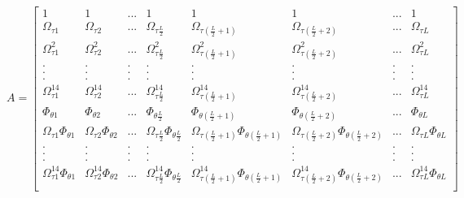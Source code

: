 $
A
=
\begin{bmatrix}
1 & 1 & ... & 1 & 1 & 1 & ... & 1 \\
\Omega_{\tau 1} & \Omega_{\tau 2} & ... & \Omega_{\tau \frac{L}{2}} & \Omega_{\tau (\frac{L}{2} + 1)} & \Omega_{\tau (\frac{L}{2} + 2)} & ... & \Omega_{\tau L} \\
\Omega^{2}_{\tau 1} & \Omega^{2}_{\tau 2} & ... & \Omega^{2}_{\tau \frac{L}{2}} & \Omega^{2}_{\tau (\frac{L}{2} + 1)} & \Omega^{2}_{\tau (\frac{L}{2} + 2)} & ... & \Omega^{2}_{\tau L} \\
. & . & . & . & . & . & . & . \\
. & . & . & . & . & . & . & . \\
. & . & . & . & . & . & . & . \\
\Omega^{14}_{\tau 1} & \Omega^{14}_{\tau 2} & ... & \Omega^{14}_{\tau \frac{L}{2}} & \Omega^{14}_{\tau (\frac{L}{2} + 1)} & \Omega^{14}_{\tau (\frac{L}{2} + 2)} & ... & \Omega^{14}_{\tau L} \\
\Phi_{\theta 1} & \Phi_{\theta 2} & ... & \Phi_{\theta \frac{L}{2}} & \Phi_{\theta (\frac{L}{2} + 1)} & \Phi_{\theta (\frac{L}{2} + 2)} & ... & \Phi_{\theta L} \\
\Omega_{\tau 1} \Phi_{\theta 1} & \Omega_{\tau 2} \Phi_{\theta 2} & ... & \Omega_{\tau \frac{L}{2}} \Phi_{\theta \frac{L}{2}} & \Omega_{\tau (\frac{L}{2} + 1)} \Phi_{\theta (\frac{L}{2} + 1)} & \Omega_{\tau (\frac{L}{2} + 2)} \Phi_{\theta (\frac{L}{2} + 2)} & ... & \Omega_{\tau L} \Phi_{\theta L} \\
. & . & . & . & . & . & . & . \\
. & . & . & . & . & . & . & . \\
. & . & . & . & . & . & . & . \\
\Omega^{14}_{\tau 1} \Phi_{\theta 1} & \Omega^{14}_{\tau 2} \Phi_{\theta 2} & ... & \Omega^{14}_{\tau \frac{L}{2}} \Phi_{\theta \frac{L}{2}} & \Omega^{14}_{\tau (\frac{L}{2} + 1)} \Phi_{\theta (\frac{L}{2} + 1)} & \Omega^{14}_{\tau (\frac{L}{2} + 2)} \Phi_{\theta (\frac{L}{2} + 2)} & ... & \Omega^{14}_{\tau L} \Phi_{\theta L} \\
\end{bmatrix}$